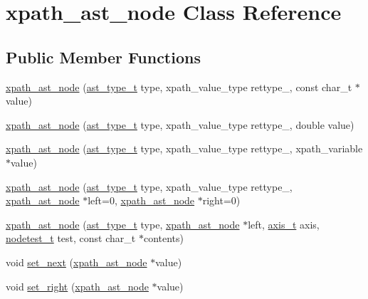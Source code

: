 \hypertarget{classxpath__ast__node}{
\section{xpath\_\-ast\_\-node Class Reference}
\label{classxpath__ast__node}
}
\subsection*{Public Member Functions}
\begin{CompactItemize}
\item 
\hyperlink{classxpath__ast__node_f155d17a4477a693d37f4e34957dcc21}{xpath\_\-ast\_\-node} (\hyperlink{pugixml_8cpp_11258a240266b84b6b0526930e5d330d}{ast\_\-type\_\-t} type, xpath\_\-value\_\-type rettype\_\-, const char\_\-t $\ast$value)
\item 
\hyperlink{classxpath__ast__node_da97458f3fc7d6c87cf70d8084117b0d}{xpath\_\-ast\_\-node} (\hyperlink{pugixml_8cpp_11258a240266b84b6b0526930e5d330d}{ast\_\-type\_\-t} type, xpath\_\-value\_\-type rettype\_\-, double value)
\item 
\hyperlink{classxpath__ast__node_8de4244f7b9fc7626049197ddc0afab7}{xpath\_\-ast\_\-node} (\hyperlink{pugixml_8cpp_11258a240266b84b6b0526930e5d330d}{ast\_\-type\_\-t} type, xpath\_\-value\_\-type rettype\_\-, xpath\_\-variable $\ast$value)
\item 
\hyperlink{classxpath__ast__node_f6f4ffea3f3c7fdb6ef1e759d4b070f4}{xpath\_\-ast\_\-node} (\hyperlink{pugixml_8cpp_11258a240266b84b6b0526930e5d330d}{ast\_\-type\_\-t} type, xpath\_\-value\_\-type rettype\_\-, \hyperlink{classxpath__ast__node}{xpath\_\-ast\_\-node} $\ast$left=0, \hyperlink{classxpath__ast__node}{xpath\_\-ast\_\-node} $\ast$right=0)
\item 
\hyperlink{classxpath__ast__node_7cf74b277deba86a6575796c727fe458}{xpath\_\-ast\_\-node} (\hyperlink{pugixml_8cpp_11258a240266b84b6b0526930e5d330d}{ast\_\-type\_\-t} type, \hyperlink{classxpath__ast__node}{xpath\_\-ast\_\-node} $\ast$left, \hyperlink{pugixml_8cpp_e7747145441b0591a5c04f20f6f9189a}{axis\_\-t} axis, \hyperlink{pugixml_8cpp_b268b4264276130baeb17ab629015275}{nodetest\_\-t} test, const char\_\-t $\ast$contents)
\item 
void \hyperlink{classxpath__ast__node_2764184d076834284eb3ff3182b845cc}{set\_\-next} (\hyperlink{classxpath__ast__node}{xpath\_\-ast\_\-node} $\ast$value)
\item 
void \hyperlink{classxpath__ast__node_fe044146db852b7d4dbf188fd2ff6c75}{set\_\-right} (\hyperlink{classxpath__ast__node}{xpath\_\-ast\_\-node} $\ast$value)

\end{CompactItemize}
